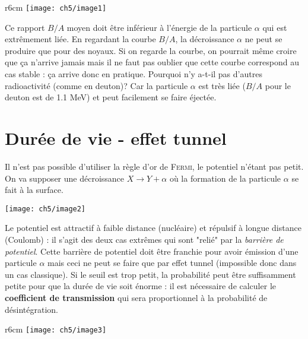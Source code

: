 \newpage
	\begin{wrapfigure}[10]{r}{6cm}
	\texttt{[image: ch5/image1]}
	\end{wrapfigure}

Ce rapport $B/A$ moyen doit être inférieur à l'énergie de la particule $\alpha$ qui est extrêmement liée. En 
regardant la courbe $B/A$, la décroissance $\alpha$ ne peut se produire que pour des noyaux. Si on regarde
la courbe, on pourrait même croire que ça n'arrive jamais mais il ne faut pas oublier que cette courbe correspond
au cas stable : ça arrive donc en pratique. Pourquoi n'y a-t-il pas d'autres radioactivité (comme en deuton)? Car
la particule $\alpha$ est très liée ($B/A$ pour le deuton est de 1.1 MeV) et peut facilement se faire éjectée.


\section{Durée de vie - effet tunnel}
Il n'est pas possible d'utiliser la règle d'or de \textsc{Fermi}, le potentiel n'étant pas petit. On va supposer
une décroissance $X\to Y+\alpha$ où la formation de la particule $\alpha$ se fait à la surface. 
\begin{center}
	\texttt{[image: ch5/image2]}
\end{center}
Le potentiel 
est attractif à faible distance (nucléaire) et répulsif à longue distance (Coulomb) : il s'agit des deux cas 
extrêmes qui sont "relié" par la \textit{barrière de potentiel}. Cette barrière de potentiel doit être franchie
pour avoir émission d'une particule $\alpha$ mais ceci ne peut se faire que par effet tunnel (impossible donc dans
un cas classique). Si le seuil est trop petit, la probabilité peut être suffisamment petite pour que la durée de
vie soit énorme : il est nécessaire de calculer le \textbf{coefficient de transmission} qui sera proportionnel
à la probabilité de désintégration.\\

	\begin{wrapfigure}[6]{r}{6cm}
	\vspace{-8mm}
	\texttt{[image: ch5/image3]}
	\end{wrapfigure}


